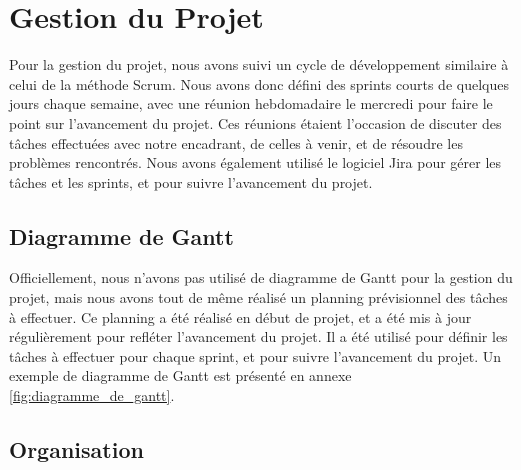 \section{Gestion du Projet}

Pour la gestion du projet, nous avons suivi un cycle de développement similaire à celui de la méthode Scrum. 
Nous avons donc défini des sprints courts de quelques jours chaque semaine, avec une réunion hebdomadaire
le mercredi pour faire le point sur l'avancement du projet. 
Ces réunions étaient l'occasion de discuter des tâches effectuées avec notre encadrant, de celles à venir, et de résoudre les problèmes rencontrés.
Nous avons également utilisé le logiciel Jira pour gérer les tâches et les sprints, et pour suivre l'avancement du projet.

\subsection{Diagramme de Gantt}
Officiellement, nous n'avons pas utilisé de diagramme de Gantt pour la gestion du projet, mais nous avons tout de même
réalisé un planning prévisionnel des tâches à effectuer.
Ce planning a été réalisé en début de projet, et a été mis à jour régulièrement pour refléter l'avancement du projet.
Il a été utilisé pour définir les tâches à effectuer pour chaque sprint, et pour suivre l'avancement du projet.
Un exemple de diagramme de Gantt est présenté en annexe \ref{fig:diagramme_de_gantt}.


\subsection{Organisation}
